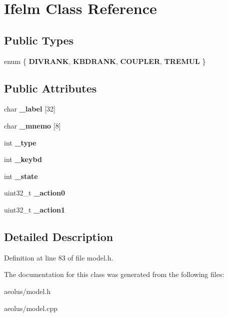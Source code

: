 \hypertarget{class_ifelm}{}\section{Ifelm Class Reference}
\label{class_ifelm}
\subsection*{Public Types}
\begin{DoxyCompactItemize}
\item 
\mbox{\label{class_ifelm_accab2e9beae2bece26655419769dee44}} 
enum \{ {\bfseries D\+I\+V\+R\+A\+NK}, 
{\bfseries K\+B\+D\+R\+A\+NK}, 
{\bfseries C\+O\+U\+P\+L\+ER}, 
{\bfseries T\+R\+E\+M\+UL}
 \}
\end{DoxyCompactItemize}
\subsection*{Public Attributes}
\begin{DoxyCompactItemize}
\item 
\mbox{\label{class_ifelm_a934ef376c4b370a97683bd9157787754}} 
char {\bfseries \+\_\+label} \mbox{[}32\mbox{]}
\item 
\mbox{\label{class_ifelm_a2eb48e92a4077f0cab58438a0606bbf2}} 
char {\bfseries \+\_\+mnemo} \mbox{[}8\mbox{]}
\item 
\mbox{\label{class_ifelm_af5a854b95026d8ff11e7c5ac34f73244}} 
int {\bfseries \+\_\+type}
\item 
\mbox{\label{class_ifelm_ab154c4008eb3be4af8653f99d77afe4c}} 
int {\bfseries \+\_\+keybd}
\item 
\mbox{\label{class_ifelm_a7a3e5f3a0604ea6c893e4f06e4279f84}} 
int {\bfseries \+\_\+state}
\item 
\mbox{\label{class_ifelm_a8593f68dbd04bc9b876544913548e45e}} 
uint32\+\_\+t {\bfseries \+\_\+action0}
\item 
\mbox{\label{class_ifelm_a927be9b4de34d904a53244fd684d98a5}} 
uint32\+\_\+t {\bfseries \+\_\+action1}
\end{DoxyCompactItemize}


\subsection{Detailed Description}


Definition at line 83 of file model.\+h.



The documentation for this class was generated from the following files\+:\begin{DoxyCompactItemize}
\item 
aeolus/model.\+h\item 
aeolus/model.\+cpp\end{DoxyCompactItemize}
